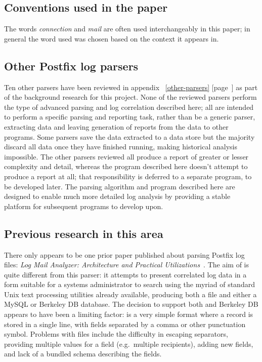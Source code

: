 \documentclass[a4paper,12pt,draft]{article}
\newcommand{\refwithpage}[1]{%
    \empty{}\ref{#1} [page~\pageref{#1}]%
}
\begin{document}
\subsection{Conventions used in the paper}

The words \textit{connection\/} and \textit{mail\/} are often used
interchangeably in this paper; in general the word used was chosen based on
the context it appears in.

\subsection{Other Postfix log parsers}

Ten other parsers have been reviewed in
appendix~\refwithpage{other-parsers} as part of the background research for
this project.  None of the reviewed parsers perform the type of advanced
parsing and log correlation described here; all are intended to perform a
specific parsing and reporting task, rather than be a generic parser,
extracting data and leaving generation of reports from the data to other
programs.  Some parsers save the data extracted to a data store but the
majority discard all data once they have finished running, making
historical analysis impossible.  The other parsers reviewed all produce a
report of greater or lesser complexity and detail, whereas the program
described here doesn't attempt to produce a report at all; that
responsibility is deferred to a separate program, to be developed later.
The parsing algorithm and program described here are designed to enable
much more detailed log analysis by providing a stable platform for
subsequent programs to develop upon.



\subsection{Previous research in this area}

\label{prior art}

There only appears to be one prior paper published about parsing Postfix
log files: \textit{Log Mail Analyzer: Architecture and Practical
Utilizations\/}~\cite{log-mail-analyser}.  The aim of \LMA{} is quite
different from this parser: it attempts to present correlated log data in a
form suitable for a systems administrator to search using the myriad of
standard Unix text processing utilities already available, producing both a
\CSV{} file and either a MySQL or Berkeley DB database.  The decision to
support both \CSV{} and Berkeley DB appears to have been a limiting factor:
\CSV{} is a very simple format where a record is stored in a single line,
with fields separated by a comma or other punctuation symbol.  Problems
with \CSV{} files include the difficulty in escaping separators, providing
multiple values for a field (e.g.\ multiple recipients), adding new fields,
and lack of a bundled schema describing the fields.
\end{document}
